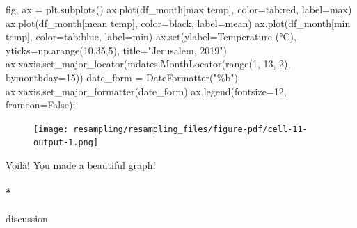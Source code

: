\documentclass[
  letterpaper,
  DIV=11,
  numbers=noendperiod,
  oneside]{scrreprt}
\let\oldparagraph\paragraph
\renewcommand{\paragraph}[1]{\oldparagraph{#1}\mbox{}}
\newenvironment{Shaded}{\begin{snugshade}}{\end{snugshade}}
\newcommand{\BuiltInTok}[1]{\textcolor[rgb]{0.00,0.23,0.31}{#1}}
\newcommand{\DecValTok}[1]{\textcolor[rgb]{0.68,0.00,0.00}{#1}}
\newcommand{\NormalTok}[1]{\textcolor[rgb]{0.00,0.23,0.31}{#1}}
\newcommand{\OperatorTok}[1]{\textcolor[rgb]{0.37,0.37,0.37}{#1}}
\newcommand{\StringTok}[1]{\textcolor[rgb]{0.13,0.47,0.30}{#1}}
\newcommand{\VariableTok}[1]{\textcolor[rgb]{0.07,0.07,0.07}{#1}}
\begin{document}
\begin{Shaded}
\begin{Highlighting}[]
\NormalTok{fig, ax }\OperatorTok{=}\NormalTok{ plt.subplots()}
\NormalTok{ax.plot(df\_month[}\StringTok{\textquotesingle{}max temp\textquotesingle{}}\NormalTok{], color}\OperatorTok{=}\StringTok{\textquotesingle{}tab:red\textquotesingle{}}\NormalTok{, label}\OperatorTok{=}\StringTok{\textquotesingle{}max\textquotesingle{}}\NormalTok{)}
\NormalTok{ax.plot(df\_month[}\StringTok{\textquotesingle{}mean temp\textquotesingle{}}\NormalTok{], color}\OperatorTok{=}\StringTok{\textquotesingle{}black\textquotesingle{}}\NormalTok{, label}\OperatorTok{=}\StringTok{\textquotesingle{}mean\textquotesingle{}}\NormalTok{)}
\NormalTok{ax.plot(df\_month[}\StringTok{\textquotesingle{}min temp\textquotesingle{}}\NormalTok{], color}\OperatorTok{=}\StringTok{\textquotesingle{}tab:blue\textquotesingle{}}\NormalTok{, label}\OperatorTok{=}\StringTok{\textquotesingle{}min\textquotesingle{}}\NormalTok{)}
\NormalTok{ax.}\BuiltInTok{set}\NormalTok{(ylabel}\OperatorTok{=}\StringTok{\textquotesingle{}Temperature (°C)\textquotesingle{}}\NormalTok{,}
\NormalTok{       yticks}\OperatorTok{=}\NormalTok{np.arange(}\DecValTok{10}\NormalTok{,}\DecValTok{35}\NormalTok{,}\DecValTok{5}\NormalTok{),}
\NormalTok{       title}\OperatorTok{=}\StringTok{"Jerusalem, 2019"}\NormalTok{)}
\NormalTok{ax.xaxis.set\_major\_locator(mdates.MonthLocator(}\BuiltInTok{range}\NormalTok{(}\DecValTok{1}\NormalTok{, }\DecValTok{13}\NormalTok{, }\DecValTok{2}\NormalTok{), bymonthday}\OperatorTok{=}\DecValTok{15}\NormalTok{))}
\NormalTok{date\_form }\OperatorTok{=}\NormalTok{ DateFormatter(}\StringTok{"\%b"}\NormalTok{)}
\NormalTok{ax.xaxis.set\_major\_formatter(date\_form)}
\NormalTok{ax.legend(fontsize}\OperatorTok{=}\DecValTok{12}\NormalTok{, frameon}\OperatorTok{=}\VariableTok{False}\NormalTok{)}\OperatorTok{;}
\end{Highlighting}
\end{Shaded}

\begin{figure}[H]

{\centering \texttt{[image: resampling/resampling\_files/figure-pdf/cell-11-output-1.png]}

}

\end{figure}

Voilà! You made a beautiful graph!

\hypertarget{discussion-2}{%
\paragraph*{discussion}\label{discussion-2}}
\end{document}
